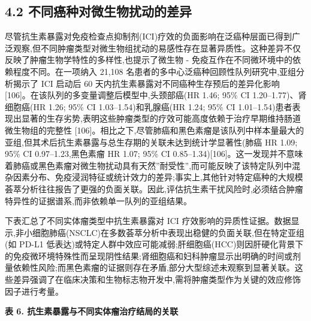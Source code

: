 \documentclass[11pt]{article}
\begin{document}
\subsection{4.2 不同癌种对微生物扰动的差异}\label{ux4e0dux540cux764cux79cdux5bf9ux5faeux751fux7269ux6270ux52a8ux7684ux5deeux5f02}

尽管抗生素暴露对免疫检查点抑制剂(ICI)疗效的负面影响在泛癌种层面已得到广泛观察,但不同肿瘤类型对微生物组扰动的易感性存在显著异质性。这种差异不仅反映了肿瘤生物学特性的多样性,也提示了微生物 - 免疫互作在不同微环境中的依赖程度不同。在一项纳入 21,108 名患者的多中心泛癌种回顾性队列研究中,亚组分析揭示了 ICI 启动后 60 天内抗生素暴露对不同癌种生存预后的差异化影响 {[}106{]}。在该队列的多变量调整后模型中,头颈部癌(HR 1.46; 95\% CI 1.20--1.77)、肾细胞癌(HR 1.26; 95\% CI 1.03--1.54)和乳腺癌(HR 1.24; 95\% CI 1.01--1.54)患者表现出显著的生存劣势,表明这些肿瘤类型的疗效可能高度依赖于治疗早期维持肠道微生物组的完整性 {[}106{]}。相比之下,尽管肺癌和黑色素瘤是该队列中样本量最大的亚组,但其术后抗生素暴露与总生存期的关联未达到统计学显著性(肺癌 HR 1.09; 95\% CI 0.97--1.23,黑色素瘤 HR 1.07; 95\% CI 0.85--1.34){[}106{]}。这一发现并不意味着肺癌或黑色素瘤对微生物扰动具有天然''耐受性'',而可能反映了该特定队列中混杂因素分布、免疫浸润特征或统计效力的差异;事实上,其他针对特定癌种的大规模荟萃分析往往报告了更强的负面关联。因此,评估抗生素干扰风险时,必须结合肿瘤特异性的证据谱系,而非依赖单一队列的亚组结果。

下表汇总了不同实体瘤类型中抗生素暴露对 ICI 疗效影响的异质性证据。数据显示,非小细胞肺癌(NSCLC)在多数荟萃分析中表现出稳健的负面关联,但在特定亚组(如 PD-L1 低表达)或特定人群中效应可能减弱;肝细胞癌(HCC)则因肝硬化背景下的免疫微环境特殊性而呈现阴性结果;肾细胞癌和妇科肿瘤显示出明确的时间或剂量依赖性风险;而黑色素瘤的证据则存在矛盾,部分大型综述未观察到显著关联。这些差异强调了在临床决策和生物标志物开发中,需将肿瘤类型作为关键的效应修饰因子进行考量。

\textbf{表 6. 抗生素暴露与不同实体瘤治疗结局的关联}
\end{document}
